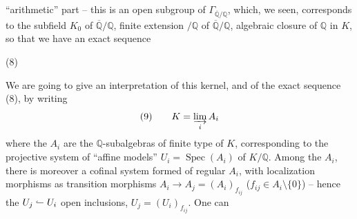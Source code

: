 ``arithmetic'' part -- this is an open subgroup of $\Gamma_{\overline{\mathbb Q}/\mathbb Q}$, which, we  seen, corresponds to the subfield $K_0$ of $\overline{\mathbb Q}/\mathbb Q$,  finite extension $/\mathbb Q$ of $\overline{\mathbb Q}/\mathbb Q$, algebraic closure of $\mathbb Q$ in $K$, so that we have an exact sequence

\noindent (8)\quad{}

We are going to give an interpretation of this kernel, and of the exact sequence (8), by writing
\[
(9)\qquad K=\varinjlim_i A_i
\]
where the $A_i$ are the $\mathbb Q$-subalgebras of finite type of $K$, corresponding to the projective system of ``affine models'' $U_i=\operatorname{Spec}(A_i)$ of $K/\mathbb Q$. Among the $A_i$, there is moreover a cofinal system formed of regular $A_i$,  with localization morphisms as transition morphisms $A_i\longrightarrow A_j=(A_i)_{f_{ij}}$ ($f_{ij}\in A_i\setminus\{0\}$) -- hence the $U_j\lhook\joinrel\relbar U_i$ open inclusions, $U_j=(U_i)_{f_{ij}}$. One can
